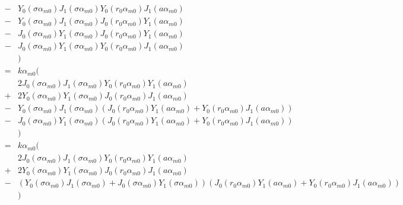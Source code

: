 \documentclass{article}
\begin{document}
\begin{eqnarray}
    &-& Y_0(\sigma\alpha_{m0}) J_1(\sigma\alpha_{m0}) Y_0(r_0\alpha_{m0}) J_1(a  \alpha_{m0}) \nonumber\\
    &-& Y_0(\sigma\alpha_{m0}) J_1(\sigma\alpha_{m0}) J_0(r_0\alpha_{m0}) Y_1(a  \alpha_{m0}) \nonumber\\
    &-& J_0(\sigma\alpha_{m0}) Y_1(\sigma\alpha_{m0}) J_0(r_0\alpha_{m0}) Y_1(a  \alpha_{m0}) \nonumber\\
    &-& J_0(\sigma\alpha_{m0}) Y_1(\sigma\alpha_{m0}) Y_0(r_0\alpha_{m0}) J_1(a  \alpha_{m0}) \nonumber\\
    & & \Big)
    \nonumber\\
    &=& k\alpha_{m0}\Big( \nonumber\\
    & & 2J_0(\sigma\alpha_{m0}) J_1(\sigma\alpha_{m0}) Y_0(r_0\alpha_{m0}) Y_1(a  \alpha_{m0}) \nonumber\\
    &+& 2Y_0(\sigma\alpha_{m0}) Y_1(\sigma\alpha_{m0}) J_0(r_0\alpha_{m0}) J_1(a  \alpha_{m0}) \nonumber\\
    &-& Y_0(\sigma\alpha_{m0}) J_1(\sigma\alpha_{m0}) (J_0(r_0\alpha_{m0}) Y_1(a  \alpha_{m0}) + Y_0(r_0\alpha_{m0}) J_1(a  \alpha_{m0})) \nonumber\\
    &-& J_0(\sigma\alpha_{m0}) Y_1(\sigma\alpha_{m0}) (J_0(r_0\alpha_{m0}) Y_1(a  \alpha_{m0}) + Y_0(r_0\alpha_{m0}) J_1(a  \alpha_{m0})) \nonumber\\
    & & \Big)
    \nonumber\\
    &=& k\alpha_{m0}\Big( \nonumber\\
    & & 2J_0(\sigma\alpha_{m0}) J_1(\sigma\alpha_{m0}) Y_0(r_0\alpha_{m0}) Y_1(a  \alpha_{m0}) \nonumber\\
    &+& 2Y_0(\sigma\alpha_{m0}) Y_1(\sigma\alpha_{m0}) J_0(r_0\alpha_{m0}) J_1(a  \alpha_{m0}) \nonumber\\
    &-& (Y_0(\sigma\alpha_{m0}) J_1(\sigma\alpha_{m0}) + J_0(\sigma\alpha_{m0}) Y_1(\sigma\alpha_{m0})) (J_0(r_0\alpha_{m0}) Y_1(a  \alpha_{m0}) + Y_0(r_0\alpha_{m0}) J_1(a  \alpha_{m0})) \nonumber\\
    & & \Big)
\end{eqnarray}
\end{document}
